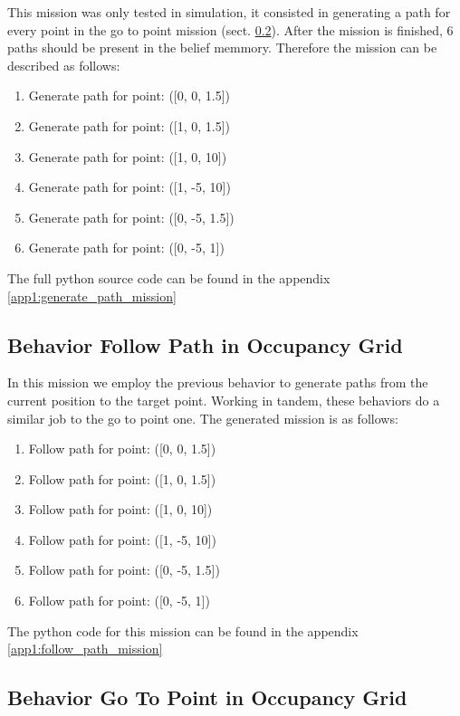     This mission was only tested in simulation, it consisted in generating a path for every point in the go to point mission (sect. \ref{ch_5:subsect:behav_gtp_mission}). After the mission is finished, $6$ paths should be present in the belief memmory. Therefore the mission can be described as follows:
    
    \begin{enumerate}
      \item Generate path for point: ([0, 0, 1.5])
      \item Generate path for point: ([1, 0, 1.5])
      \item Generate path for point: ([1, 0, 10])
      \item Generate path for point: ([1, -5, 10])
      \item Generate path for point: ([0, -5, 1.5])
      \item Generate path for point: ([0, -5, 1])
    \end{enumerate}

    The full python source code can be found in the appendix \ref{app1:generate_path_mission}

  \subsection{Behavior Follow Path in Occupancy Grid} \label{ch_5:subsect:behav_fpath_mission}

    In this mission we employ the previous behavior to generate paths from the current position to the target point. Working in tandem, these behaviors do a similar job to the go to point one. The generated mission is as follows:

    \begin{enumerate}
      \item Follow path for point: ([0, 0, 1.5])
      \item Follow path for point: ([1, 0, 1.5])
      \item Follow path for point: ([1, 0, 10])
      \item Follow path for point: ([1, -5, 10])
      \item Follow path for point: ([0, -5, 1.5])
      \item Follow path for point: ([0, -5, 1])
    \end{enumerate}

    The python code for this mission can be found in the appendix \ref{app1:follow_path_mission}

  \subsection{Behavior Go To Point in Occupancy Grid} \label{ch_5:subsect:behav_gtp_mission}


